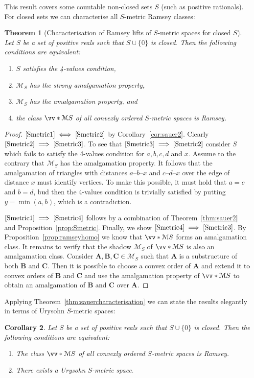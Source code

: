 \documentclass{elsarticle}
\def\ordclasssup#1#2{\vv*{#1}{#2}}
\def\str#1{\mathbf {#1}}
\theoremstyle{plain}
\newtheorem{theorem}{Theorem}[section]
\newtheorem{corollary}[theorem]{Corollary}
\theoremstyle{definition}
\theoremstyle{remark}
\begin{document}
This result covers some countable non-closed sets $S$ (such as positive rationals).
For closed sets we can characterise all $S$-metric Ramsey classes:
\begin{theorem}[Characterisation of Ramsey lifts of $S$-metric spaces for closed $S$]
\label{thm:Smetric}
Let $S$ be a set of positive reals such that $S\cup\{0\}$ is closed. Then the following conditions are equivalent:
\begin{enumerate}
 \item\label{Smetric1} $S$ satisfies the 4-values condition,
 \item\label{Smetric2} $\mathcal M_S$ has the strong amalgamation property,
 \item\label{Smetric3} $\mathcal M_S$ has the amalgamation property, and
 \item\label{Smetric4} the class $\ordclasssup{\mathcal M}{S}$ of all convexly ordered $S$-metric spaces is Ramsey.
\end{enumerate}
\end{theorem}
\begin{proof}
$\ref{Smetric1}\iff \ref{Smetric2}$ by Corollary~\ref{cor:sauer2}.
Clearly $\ref{Smetric2}\implies \ref{Smetric3}$. To see that
$\ref{Smetric3}\implies \ref{Smetric2}$ consider $S$ which fails to satisfy the
4-values condition for $a,b,c,d$ and $x$. Assume to the contrary that $\mathcal M_S$ has the amalgamation property. It follows that the amalgamation of
triangles with distances $a$--$b$--$x$ and $c$--$d$--$x$ over the edge of distance $x$ must
identify vertices. To make this possible, it must hold that $a=c$ and $b=d$, bud then the 4-values condition is trivially satisfied by putting $y=\min(a,b)$, which is a contradiction.

$\ref{Smetric1}\implies \ref{Smetric4}$ follows by a combination of Theorem~\ref{thm:sauer2} and Proposition~\ref{prop:Smetric}.
Finally, we show $\ref{Smetric4}\implies \ref{Smetric3}$. By Proposition~\ref{prop:ramseyhomo} we know that $\ordclasssup{\mathcal M}{S}$ forms an amalgamation class.
It remains to verify that the shadow $\mathcal M_S$ of $\ordclasssup{\mathcal M}{S}$ is also an amalgamation class.
Consider $\str{A},\str{B},\str{C}\in \mathcal M_S$ such that $\str{A}$ is a substructure of both $\str{B}$ and $\str{C}$.
Then it is possible to choose a convex order of $\str{A}$ and extend it to convex orders of $\str{B}$ and $\str{C}$ and use the amalgamation property of $\ordclasssup{\mathcal M}{S}$
to obtain an amalgamation of $\str{B}$ and $\str{C}$ over $\str{A}$.
\end{proof}
Applying Theorem~\ref{thm:sauercharacterisation} we can state the results elegantly in terms of Urysohn $S$-metric spaces:
\begin{corollary}
\label{cor:Smetricfin}
Let $S$ be a set of positive reals such that $S\cup\{0\}$ is closed. Then the following conditions are equivalent:
\begin{enumerate}
 \item The class $\ordclasssup{\mathcal M}{S}$ of all convexly ordered $S$-metric spaces is Ramsey.
 \item There exists a Urysohn $S$-metric space.
\end{enumerate}
\end{corollary}
\end{document}

